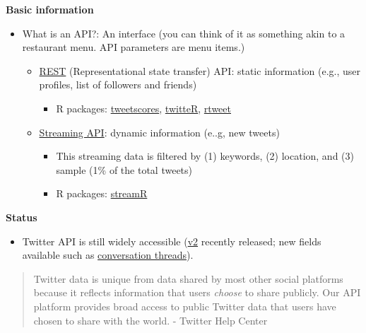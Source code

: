 \documentclass[
]{book}
\providecommand{\tightlist}{%
  \setlength{\itemsep}{0pt}\setlength{\parskip}{0pt}}
\begin{document}
\textbf{Basic information}

\begin{itemize}
\item
  What is an API?: An interface (you can think of it as something akin to a restaurant menu. API parameters are menu items.)

  \begin{itemize}
  \item
    \href{https://en.wikipedia.org/wiki/Representational_state_transfer}{REST} (Representational state transfer) API: static information (e.g., user profiles, list of followers and friends)

    \begin{itemize}
    \tightlist
    \item
      R packages: \href{https://github.com/pablobarbera/twitter_ideology/tree/master/pkg/tweetscores}{tweetscores}, \href{https://cran.r-project.org/web/packages/twitteR/twitteR.pdf}{twitteR}, \href{https://github.com/ropensci/rtweet}{rtweet}
    \end{itemize}
  \item
    \href{https://blog.axway.com/amplify/api-management/streaming-apis\#:~:text=Streaming\%20APIs\%20are\%20used\%20to,a\%20subset\%20of\%20Streaming\%20APIS.}{Streaming API}: dynamic information (e..g, new tweets)

    \begin{itemize}
    \tightlist
    \item
      This streaming data is filtered by (1) keywords, (2) location, and (3) sample (1\% of the total tweets)
    \item
      R packages: \href{https://github.com/pablobarbera/streamR}{streamR}
    \end{itemize}
  \end{itemize}
\end{itemize}

\textbf{Status}

\begin{itemize}
\tightlist
\item
  Twitter API is still widely accessible (\href{https://developer.twitter.com/en/docs/twitter-api/early-access}{v2} recently released; new fields available such as \href{https://developer.twitter.com/en/docs/twitter-api/conversation-id}{conversation threads}).
\end{itemize}

\begin{quote}
Twitter data is unique from data shared by most other social platforms because it reflects information that users \emph{choose} to share publicly. Our API platform provides broad access to public Twitter data that users have chosen to share with the world. - Twitter Help Center
\end{quote}
\end{document}
